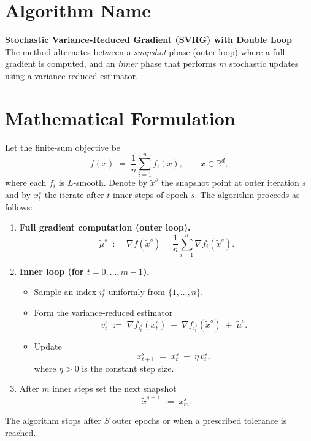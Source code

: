 \documentclass{article}
\newcommand{\R}{\mathbb{R}}
\begin{document}
\section*{Algorithm Name}
\textbf{Stochastic Variance‑Reduced Gradient (SVRG) with Double Loop}\\
The method alternates between a \emph{snapshot} phase (outer loop) where a full gradient is computed, and an \emph{inner} phase that performs $m$ stochastic updates using a variance‑reduced estimator.

\section*{Mathematical Formulation}
Let the finite‑sum objective be
\[
f(x)\;=\;\frac{1}{n}\sum_{i=1}^{n} f_i(x),\qquad x\in\R^{d},
\]
where each $f_i$ is $L$‑smooth.  
Denote by $\tilde{x}^{s}$ the snapshot point at outer iteration $s$ and by $x_{t}^{s}$ the iterate after $t$ inner steps of epoch $s$.
The algorithm proceeds as follows:

\begin{enumerate}[label=\arabic*.]
\item \textbf{Full gradient computation (outer loop).}
\[
\tilde{\mu}^{s}\;:=\;\nabla f(\tilde{x}^{s})=\frac{1}{n}\sum_{i=1}^{n}\nabla f_i(\tilde{x}^{s}).
\]
\item \textbf{Inner loop (for $t=0,\dots,m-1$).}
\begin{itemize}
    \item Sample an index $i_t^{s}$ uniformly from $\{1,\dots,n\}$.
    \item Form the variance‑reduced estimator
    \[
    v_{t}^{s}\;:=\;\nabla f_{i_t^{s}}(x_{t}^{s})\;-\;\nabla f_{i_t^{s}}(\tilde{x}^{s})\;+\;\tilde{\mu}^{s}.
    \]
    \item Update
    \[
    x_{t+1}^{s}\;=\;x_{t}^{s}\;-\;\eta\,v_{t}^{s},
    \]
    where $\eta>0$ is the constant step size.
\end{itemize}
\item After $m$ inner steps set the next snapshot
\[
\tilde{x}^{s+1}\;:=\;x_{m}^{s}.
\]
\end{enumerate}
The algorithm stops after $S$ outer epochs or when a prescribed tolerance is reached.
\end{document}
